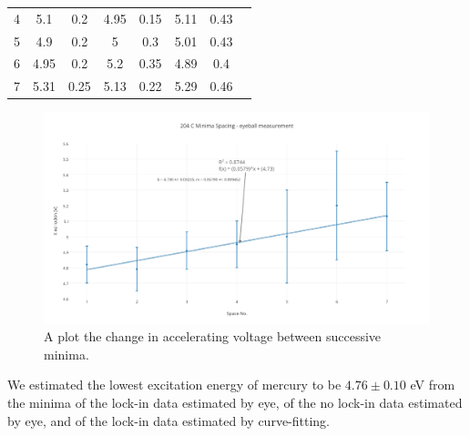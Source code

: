 \documentclass[prb,preprint]{revtex4-1}
\begin{document}
\begin{table}[h!]
\begin{ruledtabular}
\begin{tabular}{cccccccl}
4         & 5.1                                          & 0.2                                         & 4.95                                             & 0.15                                            & 5.11                                           & 0.43                                           \\
5         & 4.9                                          & 0.2                                         & 5                                                & 0.3                                             & 5.01                                           & 0.43                                           \\
6         & 4.95                                         & 0.2                                         & 5.2                                              & 0.35                                            & 4.89                                           & 0.4                                            \\
7         & 5.31                                         & 0.25                                        & 5.13                                             & 0.22                                            & 5.29                                           & 0.46                                          
\end{tabular}
\end{ruledtabular}
\label{minimaSpacing}
\end{table}

\begin{figure}[h!]
\centering
\includegraphics[width=6in]{204C_minima_eyeball.pdf}
\caption{A plot the change in accelerating voltage between successive minima.}
\label{nomineye}
\end{figure}


We estimated the lowest excitation energy of mercury to be $4.76\pm0.10$ eV from the minima of the lock-in data estimated by eye, of the no lock-in data estimated by eye, and of the lock-in data estimated by curve-fitting.
\end{document}
